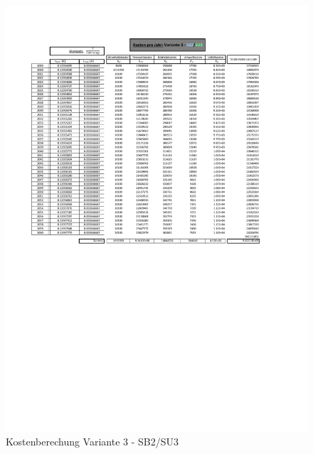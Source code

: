 \begin{figure}[h!]
	\centering
	\includegraphics[width=\textwidth]{figures/Anhang/f-00-A-V3-B2-U3}
	\caption{Kostenberechung Variante 3 - SB2/SU3}
\end{figure}

